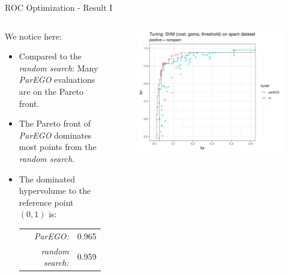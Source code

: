 \begin{frame}{ROC Optimization - Result I}

\begin{columns}
\begin{column}{0.45\textwidth}
  We notice here:
  \begin{itemize}
    \item Compared to the \emph{random search}: Many \emph{ParEGO} evaluations are on the Pareto front.
    \item The Pareto front of \emph{ParEGO} dominates most points from the \emph{random search}.
    \item The dominated hypervolume to the reference point $(0,1)$ is:
    \begin{tabular}{rl}
    \emph{ParEGO:} & 0.965\\
    \emph{random search:} & 0.959\\
    \end{tabular}
  \end{itemize}
\end{column}%
\begin{column}{0.5\textwidth}
  \begin{figure}
  \includegraphics[width=\textwidth]{images/example_parego_spam.png}
  \end{figure}
\end{column}
\end{columns}

\end{frame}

